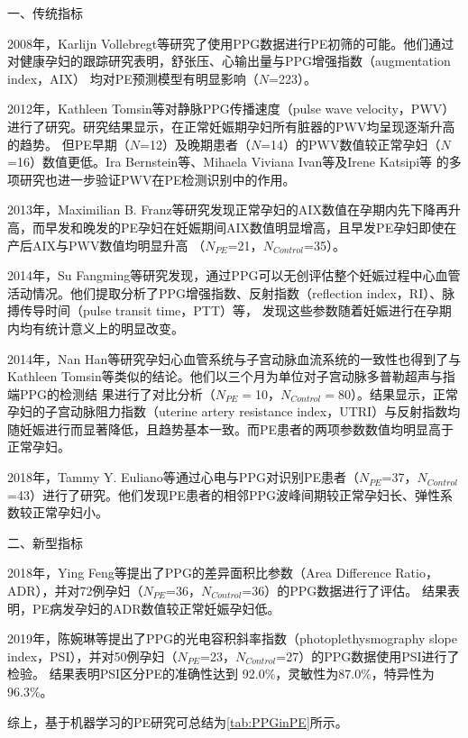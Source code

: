 一、传统指标

2008年，Karlijn Vollebregt等\cite{KARLIJN2008}研究了使用PPG数据进行PE初筛的可能。他们通过对健康孕妇的跟踪研究表明，舒张压、心输出量与PPG增强指数（augmentation index，AIX）
均对PE预测模型有明显影响（$N$=223）。

2012年，Kathleen Tomsin等\cite{Tomsin2012}对静脉PPG传播速度（pulse wave velocity，PWV）进行了研究。研究结果显示，在正常妊娠期孕妇所有脏器的PWV均呈现逐渐升高的趋势。
但PE早期（$N$=12）及晚期患者（$N$=14）的PWV数值较正常孕妇（$N$=16）数值更低。Ira Bernstein等\cite{Ira2014}、Mihaela Viviana Ivan等\cite{VivianaIvan2018}及Irene Katsipi等\cite{Katsipi2014}
的多项研究也进一步验证PWV在PE检测识别中的作用。

2013年，Maximilian B. Franz等\cite{Franz2013}研究发现正常孕妇的AIX数值在孕期内先下降再升高，而早发和晚发的PE孕妇在妊娠期间AIX数值明显增高，且早发PE孕妇即使在产后AIX与PWV数值均明显升高
（$N_{PE}$=21，$N_{Control}$=35）。

2014年，Su Fangming等\cite{Su2014}研究发现，通过PPG可以无创评估整个妊娠过程中心血管活动情况。他们提取分析了PPG增强指数、反射指数（reflection index，RI）、脉搏传导时间（pulse transit time，PTT）等，
发现这些参数随着妊娠进行在孕期内均有统计意义上的明显改变。

2014年，Nan Han等\cite{Han2014}研究孕妇心血管系统与子宫动脉血流系统的一致性也得到了与Kathleen Tomsin等\cite{Tomsin2012}类似的结论。他们以三个月为单位对子宫动脉多普勒超声与指端PPG的检测结
果进行了对比分析（$N_{PE}=$10，$N_{Control}=$80）。结果显示，正常孕妇的子宫动脉阻力指数（uterine artery resistance index，UTRI）与反射指数均随妊娠进行而显著降低，且趋势基本一致。而PE患者的两项参数数值均明显高于正常孕妇。

2018年，Tammy Y. Euliano等\cite{Euliano2018}通过心电与PPG对识别PE患者（$N_{PE}$=37，$N_{Control}$=43）进行了研究。他们发现PE患者的相邻PPG波峰间期较正常孕妇长、弹性系数较正常孕妇小。

二、新型指标

2018年，Ying Feng等\cite{Feng2018}提出了PPG的差异面积比参数（Area Difference Ratio，ADR），并对72例孕妇（$N_{PE}$=36，$N_{Control}$=36）的PPG数据进行了评估。
结果表明，PE病发孕妇的ADR数值较正常妊娠孕妇低。

2019年，陈婉琳等\cite{Chen2019}提出了PPG的光电容积斜率指数（photoplethysmography slope index，PSI），并对50例孕妇（$N_{PE}$=23，$N_{Control}$=27）的PPG数据使用PSI进行了检验。
结果表明PSI区分PE的准确性达到 92.0\%，灵敏性为87.0\%，特异性为96.3\%。

综上，基于机器学习的PE研究可总结为\autoref{tab:PPGinPE}所示。

